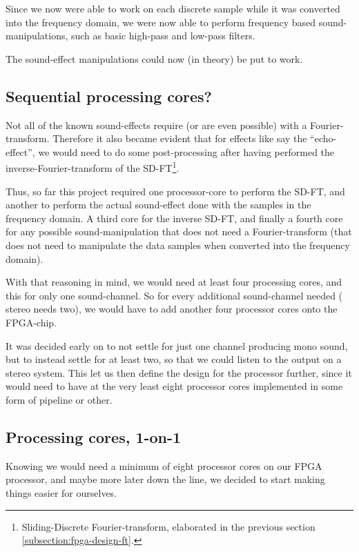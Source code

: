 Since we now were able to work on each discrete sample while it was converted
into the frequency domain, we were now able to perform frequency based
sound-manipulations, such as basic high-pass and low-pass filters.

The sound-effect manipulations could now (in theory) be put to work.

\FloatBarrier
\subsection{Sequential processing cores?}

Not all of the known sound-effects require (or are even possible) with a
Fourier-transform. Therefore it also became evident that for effects like say
the ``echo-effect'', we would need to do some post-processing after having
performed the inverse-Fourier-transform of the SD-FT\footnote{Sliding-Discrete
Fourier-transform, elaborated in the previous section
\ref{subsection:fpga-design-ft}.}.

Thus, so far this project required one processor-core to perform the SD-FT, and
another to perform the actual sound-effect done with the samples in the
frequency domain. A third core for the inverse SD-FT, and finally a fourth core
for any possible sound-manipulation that does not need a Fourier-transform (that
does not need to manipulate the data samples when converted into the frequency
domain).

With that reasoning in mind, we would need at least four processing cores, and
this for only one sound-channel. So for every additional sound-channel needed (
stereo needs two), we would have to add another four processor cores onto the
FPGA-chip.

It was decided early on to not settle for just one channel producing mono sound,
but to instead settle for at least two, so that we could listen to the output
on a stereo system. This let us then define the design for the processor
further, since it would need to have at the very least eight processor cores
implemented in some form of pipeline or other.

\FloatBarrier
\subsection{Processing cores, 1-on-1}

Knowing we would need a minimum of eight processor cores on our FPGA processor,
and maybe more later down the line, we decided to start making things easier
for ourselves.

